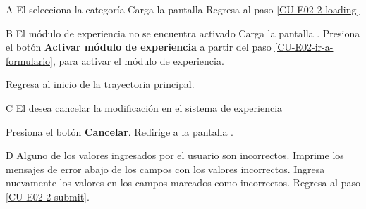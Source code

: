 \begin{UCtrayectoriaA}{A}{
El  selecciona la categoría }
  \Sistema Carga la pantalla 
  \Actor Regresa al paso \ref{CU-E02-2-loading}
\end{UCtrayectoriaA}

\begin{UCtrayectoriaA}{B}{
El módulo de experiencia no se encuentra activado}
  \Sistema Carga la pantalla .
  \Actor Presiona el botón {\bf Activar módulo de experiencia}
   a partir del paso \ref{CU-E02-ir-a-formulario},
                     para activar el módulo de experiencia.

  \Sistema Regresa al inicio de la trayectoria principal.

\end{UCtrayectoriaA}

\begin{UCtrayectoriaA}{C}{
El  desea cancelar la modificación en el sistema de
experiencia}

  \Actor Presiona el botón {\bf Cancelar}.
  \Sistema Redirige a la pantalla .
\end{UCtrayectoriaA}

\begin{UCtrayectoriaA}{D}{
Alguno de los valores ingresados por el usuario son incorrectos.}
  \Sistema Imprime los mensajes de error abajo de los campos con los valores
           incorrectos.
  \Actor Ingresa nuevamente los valores en los campos marcados como incorrectos.
  \Sistema Regresa al paso \ref{CU-E02-2-submit}.

\end{UCtrayectoriaA}
